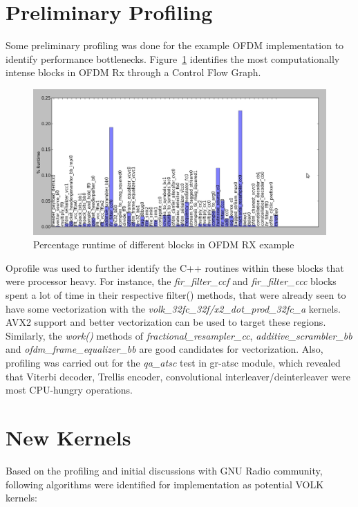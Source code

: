 \documentclass[a4paper,12pt,oneside]{article}
\begin{document}
\section{Preliminary Profiling}
\label{sec:profiling}
Some preliminary profiling was done for the example OFDM implementation to identify performance bottlenecks. Figure~\ref{fig:1} identifies the most computationally intense blocks in OFDM Rx through a Control Flow Graph. 

\begin{figure}[h] 
\centering\includegraphics[width=5in]{figure/ofdm_rx.png}
\caption{Percentage runtime of different blocks in OFDM RX example \label{fig:1} }
\end{figure}

Oprofile \cite{oprofile} was used to further identify the C++ routines within these blocks that were processor heavy. For instance, the {\it fir\_filter\_ccf} and {\it fir\_filter\_ccc} blocks spent a lot of time in their respective filter() methods, that were already seen to have some vectorization with the {\it volk\_32fc\_32f/x2\_dot\_prod\_32fc\_a} kernels. AVX2 support and better vectorization can be used to target these regions. Similarly, the {\it work()} methods of {\it fractional\_resampler\_cc}, {\it additive\_scrambler\_bb} and {\it ofdm\_frame\_equalizer\_bb} are good candidates for vectorization. Also, profiling was carried out for the {\it qa\_atsc} test in gr-atsc module, which revealed that Viterbi decoder, Trellis encoder, convolutional interleaver/deinterleaver were most CPU-hungry operations.

\section{New Kernels}

Based on the profiling and initial discussions with GNU Radio community, following algorithms were identified for implementation as potential VOLK kernels:
\end{document}
